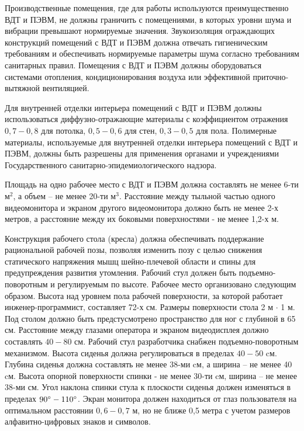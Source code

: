 Производственные помещения, где для работы используются преимущественно ВДТ и
ПЭВМ, не должны граничить с помещениями, в которых уровни шума и вибрации превышают
нормируемые значения. Звукоизоляция ограждающих конструкций помещений с ВДТ и ПЭВМ
должна отвечать гигиеническим требованиям и обеспечивать нормируемые параметры шума
согласно требованиям санитарных правил. Помещения с ВДТ и ПЭВМ должны оборудоваться
системами отопления, кондиционирования воздуха или эффективной приточно-вытяжной
вентиляцией.

Для внутренней отделки интерьера помещений с ВДТ и ПЭВМ должны использоваться
диффузно-отражающие материалы с коэффициентом отражения $0,7 - 0,8$ для потолка,
$0,5 - 0,6$ для стен, $0,3 - 0,5$ для пола. Полимерные материалы, используемые для
внутренней отделки интерьера помещений с ВДТ и ПЭВМ, должны быть разрешены для
применения органами и учреждениями Государственного санитарно-эпидемиологического
надзора.

Площадь на одно рабочее место с ВДТ и ПЭВМ должна составлять не менее 6-ти $\text{м}^2$,
а объем – не менее 20-ти $\text{м}^3$. Расстояние между тыльной частью одного
видеомонитора и экраном другого видеомонитора должно быть не менее 2-х метров, а
расстояние между их боковыми поверхностями - не менее 1,2-х м.

Конструкция рабочего стола (кресла) должна обеспечивать поддержание рациональной
рабочей позы, позволяя изменить позу с целью снижения статического напряжения мышц
шейно-плечевой области и спины для предупреждения развития утомления. Рабочий стул
должен быть подъемно-поворотным и регулируемым по высоте. Рабочее место организовано
следующим образом. Высота над уровнем пола рабочей поверхности, за которой работает
инженер-программист, составляет 72-х см. Размеры поверхности стола
2 м $\cdot$ 1 м. Под столом должно быть предстусмотрено пространство
для ног с глубиной в 65 см. Расстояние между глазами оператора и
экраном видеодисплея должно
составлять $40 - 80$ см. Рабочий стул разработчика снабжен подъемно-поворотным
механизмом. Высота сиденья должна регулироваться в пределах $40 - 50$ cм. Глубина
сиденья должна составлять не менее 38-ми cм, а ширина – не менее 40 cм. Высота
опорной поверхности спинки - не менее 30-ти cм, ширина – не менее 38-ми см. Угол наклона
спинки стула к плоскости сиденья должен изменяться в пределах $90 \degree - 110 \degree$.
Экран монитора должен находиться от глаз пользователя на оптимальном
расстоянии $0,6 - 0,7$ м, но не ближе 0,5 метра с учетом размеров алфавитно-цифровых
знаков и символов.

